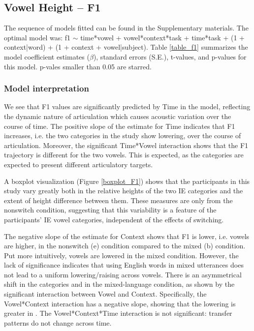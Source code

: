 \documentclass[12 pt]{article}
\newcommand{\nt}[1]{\textipa{[#1]}} %
\begin{document}
\subsection{Vowel Height -- F1}

The sequence of models fitted can be found in the Supplementary materials. The optimal model was: f1 $\sim$ time*vowel + vowel*context*task + time*task + (1 + context|word) + (1 + context + vowel|subject). Table \ref{table_f1} summarizes the model coefficient estimates ($\beta$), standard errors (S.E.), t-values, and p-values for this model. p-vales smaller than 0.05 are starred. 

\subsubsection*{Model interpretation}
We see that F1 values are significantly predicted by Time in the model, reflecting the dynamic nature of articulation which causes acoustic variation over the course of time. The positive slope of the estimate for Time indicates that F1 increases, i.e. the two categories in the study show lowering, over the course of articulation. Moreover, the significant Time*Vowel interaction shows that the F1 trajectory is different for the two vowels. This is expected, as the categories are expected to present different articulatory targets.  

A boxplot visualization (Figure \ref{boxplot_F1}) shows that the participants in this study vary greatly both in the relative heights of the two IE categories \nt{2, \ae} and the extent of height difference between them. These measures are only from the nonswitch condition, suggesting that this variability is a feature of the participants' IE vowel categories, independent of the effects of switching.  
 
The negative slope of the estimate for Context shows that F1 is lower, i.e. vowels are higher, in the nonswitch (e) condition compared to the mixed (b) condition. Put more intuitively, vowels are lowered in the mixed condition. However, the lack of significance indicates that using English words in mixed utterances does not lead to a uniform lowering/raising across vowels. There is an asymmetrical shift in the categories \nt{2} and \nt{\ae} in the mixed-language condition, as shown by the significant interaction between Vowel and Context. Specifically, the Vowel*Context interaction has a negative slope, showing that the lowering is greater in \nt{2}. The Vowel*Context*Time interaction is not significant: transfer patterns do not change across time. 
 
\end{document}
